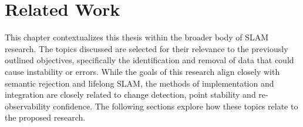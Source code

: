 \section{Related Work}
\label{sec:related_work}

This chapter contextualizes this thesis within the broader body of SLAM research. The topics discussed are selected for their relevance to the previously outlined objectives, specifically the identification and removal of data that could cause instability or errors. While the goals of this research align closely with semantic rejection and lifelong SLAM, the methods of implementation and integration are closely related to change detection, point stability and re-observability confidence. The following sections explore how these topics relate to the proposed research.

% 